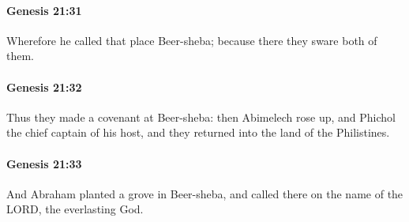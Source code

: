 		\paragraph{Genesis 21:31} %
			\label{GENESIS-21-31}

			Wherefore he called that place Beer-sheba; because there they sware both of them.


		\paragraph{Genesis 21:32} %
			\label{GENESIS-21-32}

			Thus they made a covenant at Beer-sheba: then Abimelech rose up, and Phichol the chief captain of his host, and they returned into the land of the Philistines.


		\paragraph{Genesis 21:33} %
			\label{GENESIS-21-33}

			And Abraham planted a grove in Beer-sheba, and called there on the name of the LORD, the everlasting God.



